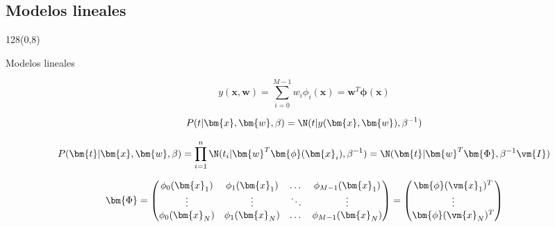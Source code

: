 \documentclass[shownotes]{beamer}
\begin{document}
\subsection{Modelos lineales}

\begin{frame}
\begin{textblock}{128}(0,8)
\begin{center}
 \large Modelos lineales
\end{center}
\end{textblock}
 \vspace{0.75cm}
 
\begin{equation*}
y(\bm{x},\bm{w}) = \sum_{i=0}^{M-1} w_i \phi_i(\bm{x}) = \bm{w}^T \bm{\phi}(\bm{x})
\end{equation*}

\vspace{0.5cm}
\pause
% 
 
 \begin{equation*}
P(t | \bm{x}, \bm{w}, \beta) = \N(t | y(\bm{x},\bm{w}) , \beta^{-1})
\end{equation*}
\vspace{0.025cm}
\pause
 
\begin{equation*}
P(\bm{t} | \bm{x}, \bm{w}, \beta) = \prod_{i=1}^n \N(t_i | \bm{w}^T \bm{\phi}(\bm{x}_i) , \beta^{-1}) = \N(\bm{t}|\bm{w}^T \bm{\Phi}, \beta^{-1} \vm{I})
\end{equation*}
\vspace{0.05cm}
\pause

\begin{equation*}
 \bm{\Phi} =
  \begin{pmatrix}
    \phi_0(\bm{x}_1) & \phi_1(\bm{x}_1) & \dots & \phi_{M-1}(\bm{x}_1)\\
    \vdots & \vdots & \ddots & \vdots \\
    \phi_0(\bm{x}_N) & \phi_1(\bm{x}_N) & \dots & \phi_{M-1}(\bm{x}_N)
  \end{pmatrix}
  = 
  \begin{pmatrix}
   \bm{\phi}(\vm{x}_1)^T \\
   \vdots \\
   \bm{\phi}(\vm{x}_N)^T \\
  \end{pmatrix}
\end{equation*}

 
\end{frame}
\end{document}
